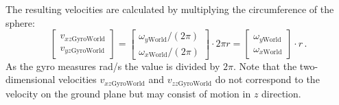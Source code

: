 \documentclass[letterpaper, 10 pt, conference]{ieeeconf}  %
\begin{document}
The resulting velocities are calculated by multiplying the circumference of the sphere:
\begin{equation}
\begin{bmatrix}
v_{xz\text{GyroWorld}} \\ v_{yz\text{GyroWorld}}
\end{bmatrix} = 
\begin{bmatrix}
\omega_{y\text{World}}/(2 \pi ) \\ \omega_{x\text{World}} / (2 \pi)
\end{bmatrix}
\cdot 2\pi r = \begin{bmatrix}
\omega_{y\text{World}}\\ \omega_{x\text{World}} 
\end{bmatrix}
\cdot r \,.
\end{equation}
As the gyro measures rad/s the value is divided by $2\pi$.
Note that the two-dimensional velocities $v_{xz\text{GyroWorld}}$ and $v_{zz\text{GyroWorld}}$ do not correspond to the velocity on the ground plane but may consist of motion in $z$ direction. 
\end{document}
